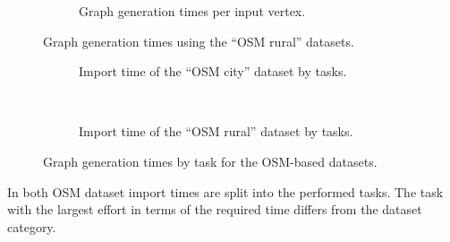 \begin{figure}[h!]
\begin{minipage}{.48\textwidth}
\begin{subfigure}[t]{\linewidth}
\begin{figcenter}
						\end{figcenter}
						\caption{Graph generation times per input vertex.}
						\label{fig:eval-import-rural-rel}
					\end{subfigure}
%							
					\caption{Graph generation times using the \enquote{OSM rural} datasets.}
					\label{fig:eval-import-rural}
				\end{minipage}
			\end{figure}
			
			\begin{figure}[h!]
				\begin{figcenter}
					\begin{subfigure}[t]{\textwidth}
						\begin{figcenter}
							
						\end{figcenter}
						\caption{Import time of the \enquote{OSM city} dataset by tasks.}
					\end{subfigure}
					\\[3ex]
					\begin{subfigure}[t]{\textwidth}
						\begin{figcenter}
							
						\end{figcenter}
						\caption{Import time of the \enquote{OSM rural} dataset by tasks.}
					\end{subfigure}
				\end{figcenter}
				\caption{Graph generation times by task for the OSM-based datasets.}
				\label{fig:eval-import-details}
			\end{figure}
			
			In  both OSM dataset import times are split into the performed tasks.
			The task with the largest effort in terms of the required time differs from the dataset category.
			
